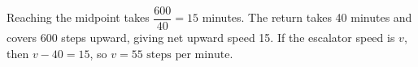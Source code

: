 Reaching the midpoint takes $\dfrac{600}{40}=15 $ minutes. The return takes 40 minutes and covers 600 steps upward, giving net upward speed 15. If the escalator speed is $ v $, then $ v-40=15 $, so $\boxed{v=55\text{ steps per minute}}$.
